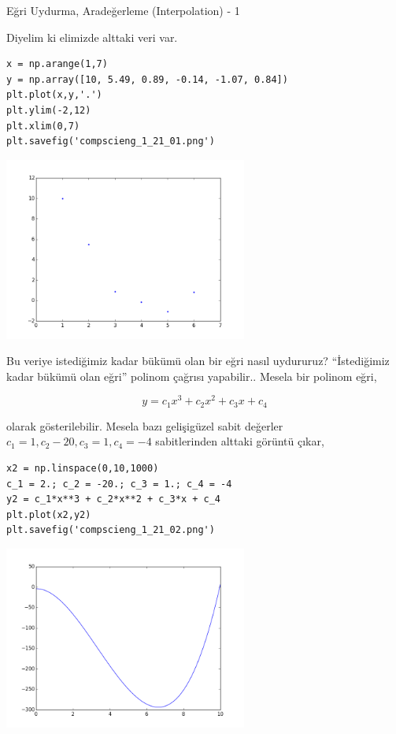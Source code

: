 \documentclass[12pt,fleqn]{article}\usepackage{../../common}
\begin{document}
Eğri Uydurma, Aradeğerleme (Interpolation) - 1

Diyelim ki elimizde alttaki veri var.

\begin{verbatim}
x = np.arange(1,7)
y = np.array([10, 5.49, 0.89, -0.14, -1.07, 0.84])
plt.plot(x,y,'.')
plt.ylim(-2,12)
plt.xlim(0,7)
plt.savefig('compscieng_1_21_01.png')
\end{verbatim}

\includegraphics[height=6cm]{compscieng_1_21_01.png}

Bu veriye istediğimiz kadar bükümü olan bir eğri nasıl uydururuz?
``İstediğimiz kadar bükümü olan eğri'' polinom çağrısı yapabilir.. Mesela
bir polinom eğri,

$$ y = c_1 x^3 + c_2x^2 + c_3x + c_4 $$

olarak gösterilebilir. Mesela bazı gelişigüzel sabit değerler
$c_1=1,c_2-20,c_3=1,c_4=-4$ sabitlerinden alttaki görüntü çıkar,

\begin{verbatim}
x2 = np.linspace(0,10,1000)
c_1 = 2.; c_2 = -20.; c_3 = 1.; c_4 = -4
y2 = c_1*x**3 + c_2*x**2 + c_3*x + c_4
plt.plot(x2,y2)
plt.savefig('compscieng_1_21_02.png')
\end{verbatim}

\includegraphics[height=6cm]{compscieng_1_21_02.png}
\end{document}
